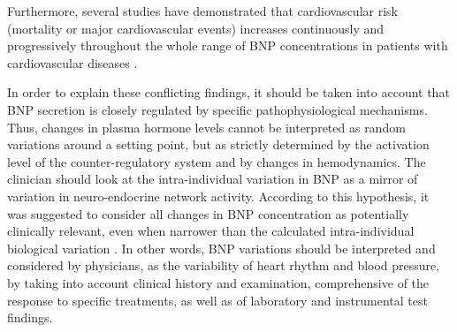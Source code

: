 \documentclass[14pt,a4paper,onecolumn]{extarticle}
\begin{document}
Furthermore, several studies have demonstrated that cardiovascular risk (mortality or major cardiovascular events) increases continuously and progressively throughout the whole range of BNP concentrations in patients with cardiovascular diseases \citep{bib35} \citep{bib377} \citep{bib378} \citep{bib379}.

In order to explain these conflicting findings, it should be taken into account that BNP secretion is closely regulated by specific pathophysiological mechanisms. Thus, changes in plasma hormone levels cannot be interpreted as random variations around a setting point, but as strictly determined by the activation level of the counter-regulatory system and by changes in hemodynamics. The clinician should look at the intra-individual variation in BNP as a mirror of variation in neuro-endocrine network activity. According to this hypothesis, it was suggested to consider all changes in BNP concentration as potentially clinically relevant, even when narrower than the calculated intra-individual biological variation \citep{bib3103}.
In other words, BNP variations should be interpreted and considered by physicians, as the variability of heart rhythm and blood pressure, by taking into account clinical history and examination, comprehensive of the response to specific treatments, as well as of laboratory and instrumental test findings.

\end{document}
